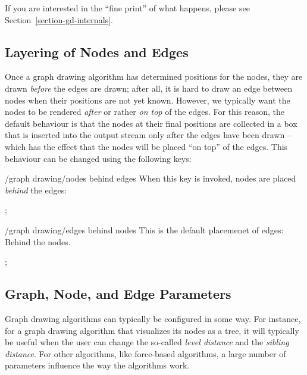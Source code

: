 If you are interested in the ``fine print'' of what happens, please
see Section~\ref{section-gd-internals}.


\subsection{Layering of Nodes and Edges}

Once a graph drawing algorithm has determined positions for the nodes,
they are drawn \emph{before} the edges are drawn; after
all, it is hard to draw an edge between nodes when their positions
are not yet known. However, we typically want the nodes to be
rendered \emph{after} or rather \emph{on top} of the edges. For
this reason, the default behaviour is that the nodes at their
final positions are collected in a box that is inserted into the
output stream only after the edges have been drawn -- which has
the effect that the nodes will be placed ``on top'' of the
edges. This behaviour can be changed using the following keys:

\begin{key}{/graph drawing/nodes behind edges}
  When this key is invoked, nodes are placed \emph{behind} the edges:
\begin{codeexample}[]
\tikz {};    
\end{codeexample}
\end{key}
\begin{key}{/graph drawing/edges behind nodes}
  This is the default placemenet of edges: Behind the nodes.
\begin{codeexample}[]
\tikz {};    
\end{codeexample}
\end{key}


\subsection{Graph, Node, and Edge Parameters}

Graph drawing algorithms can typically be configured in some way. For
instance, for a graph drawing algorithm that visualizes its nodes as a
tree, it will typically be useful when the user can change the
so-called \emph{level distance} and the \emph{sibling distance}. For
other algorithms, like force-based algorithms, a large number of
parameters influence the way the algorithms work.

